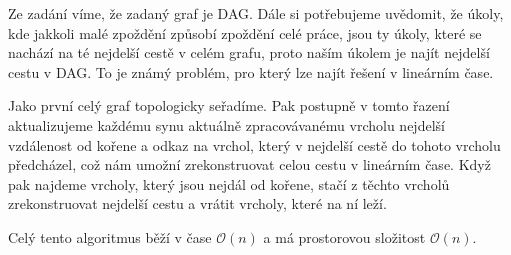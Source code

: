 \documentclass{fkssolpub}
\author{Ondřej Sedláček}
\begin{document}
 

Ze zadání víme, že zadaný graf je DAG. Dále si potřebujeme uvědomit,
že úkoly, kde jakkoli malé zpoždění způsobí zpoždění celé práce, jsou
ty úkoly, které se nachází na té nejdelší cestě v celém grafu, proto
naším úkolem je najít nejdelší cestu v DAG. To je známý problém,
pro který lze najít řešení v lineárním čase.

Jako první celý graf topologicky seřadíme. Pak postupně v tomto
řazení aktualizujeme každému synu aktuálně zpracovávanému vrcholu
nejdelší vzdálenost od kořene a odkaz na vrchol, který v nejdelší cestě
do tohoto vrcholu předcházel, což nám umožní zrekonstruovat celou cestu v lineárním čase.
Když pak najdeme vrcholy, který jsou nejdál od kořene, stačí z těchto vrcholů
zrekonstruovat nejdelší cestu a vrátit vrcholy, které na ní leží.

Celý tento algoritmus běží v čase $\mathcal{O}(n)$ a má prostorovou
složitost $\mathcal{O}(n)$.
\end{document}
